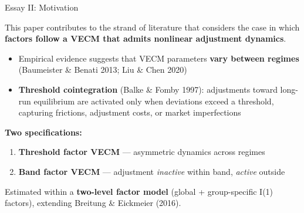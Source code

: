 \documentclass{beamer}
\begin{document}
\begin{frame}{Essay II: Motivation}

This paper contributes to the strand of literature that considers the case in which \textbf{factors follow a VECM that admits nonlinear adjustment dynamics}.

\begin{itemize}
  \item Empirical evidence suggests that VECM parameters \textbf{vary between regimes} (Baumeister \& Benati 2013; Liu \& Chen 2020)
  \item \textbf{Threshold cointegration} (Balke \& Fomby 1997): adjustments toward long-run equilibrium are activated only when deviations exceed a threshold, capturing frictions, adjustment costs, or market imperfections
\end{itemize}

\vspace{0.3em}
\textbf{Two specifications:}
\begin{enumerate}
  \item \textbf{Threshold factor VECM} --- asymmetric dynamics across regimes
  \item \textbf{Band factor VECM} --- adjustment \emph{inactive} within band, \emph{active} outside
\end{enumerate}

\vspace{0.2em}
Estimated within a \textbf{two-level factor model} (global + group-specific I(1) factors), extending Breitung \& Eickmeier (2016).

\end{frame}
\end{document}
